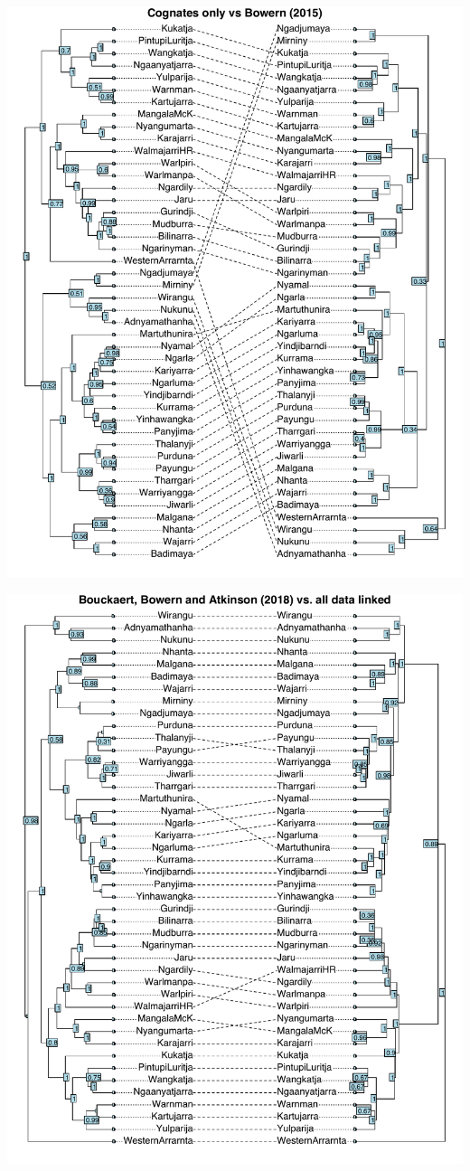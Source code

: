 \documentclass[]{article}
\begin{document}
\includegraphics{fig/cogs_vs_cb2015.pdf}

\includegraphics{fig/bba2018_vs_linked_all.pdf}
\end{document}
